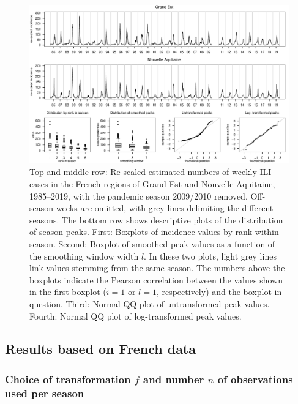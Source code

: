 \documentclass[12pt]{article}
\begin{document}
\begin{figure}[h]
\center
\includegraphics[width=1\textwidth]{figure/plot_data_fr.pdf}
\caption{Top and middle row: Re-scaled estimated numbers of weekly ILI cases in the French regions of Grand Est and Nouvelle Aquitaine, 1985--2019, with the pandemic season 2009/2010 removed. Off-season weeks are omitted, with grey lines delimiting the different seasons. The bottom row shows descriptive plots of the distribution of season peaks. First: Boxplots of incidence values by rank within season. Second: Boxplot of smoothed peak values as a function of the smoothing window width $l$. In these two plots, light grey lines link values stemming from the same season. The numbers above the boxplots indicate the Pearson correlation between the values shown in the first boxplot ($i = 1$ or $l = 1$, respectively) and the boxplot in question. Third: Normal QQ plot of untransformed peak values. Fourth: Normal QQ plot of log-transformed peak values.}
\label{fig:data}
\end{figure}

\subsection{Results based on French data}

\subsubsection{Choice of transformation $f$ and number $n$ of observations used per season}
\label{subsubsec:n}
\end{document}
